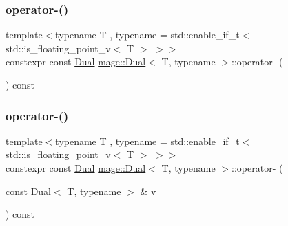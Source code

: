 \subsubsection{\texorpdfstring{operator-\/()}{operator-()}\hspace{0.1cm}{\footnotesize\ttfamily [1/3]}}
{\footnotesize\ttfamily template$<$typename T , typename  = std\+::enable\+\_\+if\+\_\+t$<$ std\+::is\+\_\+floating\+\_\+point\+\_\+v$<$ T $>$ $>$$>$ \\
constexpr const \mbox{\hyperlink{structmage_1_1_dual}{Dual}} \mbox{\hyperlink{structmage_1_1_dual}{mage\+::\+Dual}}$<$ T, typename $>$\+::operator-\/ (\begin{DoxyParamCaption}{ }\end{DoxyParamCaption}) const\hspace{0.3cm}{\ttfamily [noexcept]}}

\mbox{\label{structmage_1_1_dual_a0071177bccbdd2882714c95b310ba00e}} 
\subsubsection{\texorpdfstring{operator-\/()}{operator-()}\hspace{0.1cm}{\footnotesize\ttfamily [2/3]}}
{\footnotesize\ttfamily template$<$typename T , typename  = std\+::enable\+\_\+if\+\_\+t$<$ std\+::is\+\_\+floating\+\_\+point\+\_\+v$<$ T $>$ $>$$>$ \\
constexpr const \mbox{\hyperlink{structmage_1_1_dual}{Dual}} \mbox{\hyperlink{structmage_1_1_dual}{mage\+::\+Dual}}$<$ T, typename $>$\+::operator-\/ (\begin{DoxyParamCaption}\item[{const \mbox{\hyperlink{structmage_1_1_dual}{Dual}}$<$ T, typename $>$ \&}]{v }\end{DoxyParamCaption}) const\hspace{0.3cm}{\ttfamily [noexcept]}}

\mbox{\label{structmage_1_1_dual_ae8837a79ce18241475771a1d381395bd}} 
